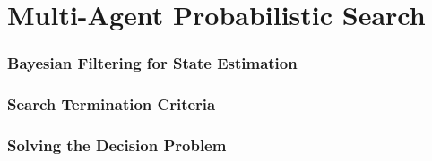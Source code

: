 \chapter{Multi-Agent Probabilistic Search}
\placeholder{}

\subsection{Bayesian Filtering for State Estimation}

\subsection{Search Termination Criteria}

\subsection{Solving the Decision Problem}
